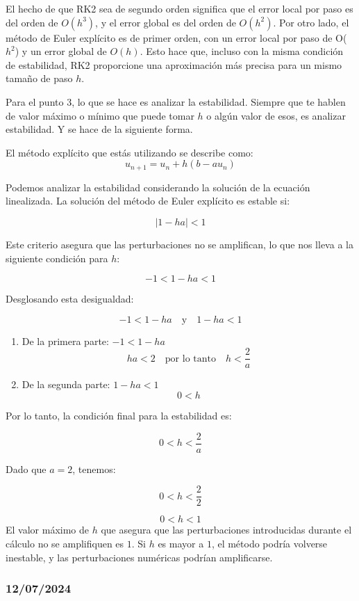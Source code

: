 El hecho de que RK2 sea de segundo orden significa que el error local por paso es del orden de $O(h^3)$, y el error global es del orden de $O(h^2)$. Por otro lado, el método de Euler explícito es de primer orden, con un error local por paso de O($h^2$) y un error global de $O(h)$. Esto hace que, incluso con la misma condición de estabilidad, RK2 proporcione una aproximación más precisa para un mismo tamaño de paso $h$.


Para el punto 3, lo que se hace es analizar la estabilidad. Siempre que te hablen de valor máximo o mínimo que puede tomar $h$ o algún valor de esos, es analizar estabilidad. Y se hace de la siguiente forma.

El método explícito que estás utilizando se describe como:
\[
u_{n+1} = u_n + h(b - au_n)
\]

Podemos analizar la estabilidad considerando la solución de la ecuación linealizada. La solución del método de Euler explícito es estable si:

\[
|1 - h a| < 1
\]

Este criterio asegura que las perturbaciones no se amplifican, lo que nos lleva a la siguiente condición para \( h \):

\[
-1 < 1 - h a < 1
\]

Desglosando esta desigualdad:

\[
-1 < 1 - h a \quad \text{y} \quad 1 - h a < 1
\]

\begin{enumerate}
\item De la primera parte: \( -1 < 1 - h a \)
    \[
    h a < 2 \quad \text{por lo tanto} \quad h < \frac{2}{a}
    \]
\item De la segunda parte: \( 1 - h a < 1 \)
    \[
    0 < h
    \]
\end{enumerate}

Por lo tanto, la condición final para la estabilidad es:

\[
0 < h < \frac{2}{a}
\]

Dado que \( a = 2 \), tenemos:

\[
0 < h < \frac{2}{2}
\]

\[
0 < h < 1
\]
El valor máximo de \( h \) que asegura que las perturbaciones introducidas durante el cálculo no se amplifiquen es \( 1 \). Si \( h \) es mayor a \( 1 \), el método podría volverse inestable, y las perturbaciones numéricas podrían amplificarse.

\subsubsection{12/07/2024}

